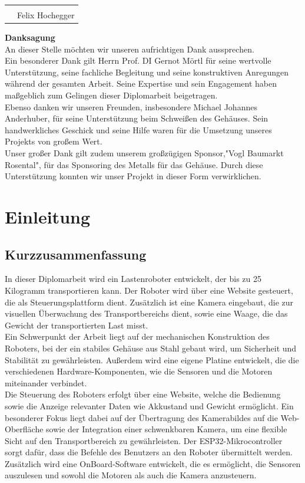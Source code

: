 \documentclass[ngerman,12pt,a4paper]{article}
\begin{document}
	\vspace{2cm}
	\noindent
	\begin{tabular}{p{7cm} p{7cm}}
		& \hrulefill \\
		& Felix Hochegger \\
	\end{tabular}
	\newpage
	\textbf{\Huge Danksagung}\\[0.5 cm]
	An dieser Stelle möchten wir unseren aufrichtigen Dank aussprechen.\\[0.5 cm]
	Ein besonderer Dank gilt Herrn Prof. DI Gernot Mörtl für seine wertvolle Unterstützung, seine fachliche Begleitung und seine konstruktiven Anregungen während der gesamten Arbeit. Seine Expertise und sein Engagement haben maßgeblich zum Gelingen dieser Diplomarbeit beigetragen.\\[0.5 cm]
	Ebenso danken wir unseren Freunden, insbesondere Michael Johannes Anderhuber, für seine Unterstützung beim Schweißen des Gehäuses. Sein handwerkliches Geschick und seine Hilfe waren für die Umsetzung unseres Projekts von großem Wert.\\[0.5 cm]
	Unser großer Dank gilt zudem unserem großzügigen Sponsor,"Vogl Baumarkt Rosental", für das Sponsoring des Metalls für das Gehäuse. Durch diese Unterstützung konnten wir unser Projekt in dieser Form verwirklichen.
	\newpage
	\tableofcontents
	\newpage
	\section{Einleitung}
	\subsection{Kurzzusammenfassung}
	In dieser Diplomarbeit wird ein Lastenroboter entwickelt, der bis zu 25 Kilogramm transportieren kann. Der Roboter wird über eine Website gesteuert, die als Steuerungsplattform dient. Zusätzlich ist eine Kamera eingebaut, die zur visuellen Überwachung des Transportbereichs dient, sowie eine Waage, die das Gewicht der transportierten Last misst.\\[0.5 cm]
	Ein Schwerpunkt der Arbeit liegt auf der mechanischen Konstruktion des Roboters, bei der ein stabiles Gehäuse aus Stahl gebaut wird, um Sicherheit und Stabilität zu gewährleisten. Außerdem wird eine eigene Platine entwickelt, die die verschiedenen Hardware-Komponenten, wie die Sensoren und die Motoren miteinander verbindet.\\[0.5 cm]
	Die Steuerung des Roboters erfolgt über eine Website, welche die Bedienung sowie die Anzeige relevanter Daten wie Akkustand und Gewicht ermöglicht. Ein besonderer Fokus liegt dabei auf der Übertragung des Kamerabildes auf die Web-Oberfläche sowie der Integration einer schwenkbaren Kamera, um eine flexible Sicht auf den Transportbereich zu gewährleisten. Der ESP32-Mikrocontroller sorgt dafür, dass die Befehle des Benutzers an den Roboter übermittelt werden.\\[0.5 cm]
	Zusätzlich wird eine OnBoard-Software entwickelt, die es ermöglicht, die Sensoren auszulesen und sowohl die Motoren als auch die Kamera anzusteuern.\\[0.5 cm]
	
\end{document}
